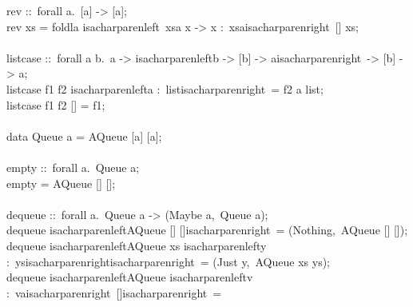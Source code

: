 \begin{isabellebody}
\begin{isamarkuptext}
\hspace*{0pt}rev ::~forall a.~[a] -> [a];\\
\hspace*{0pt}rev xs = foldla {}{}isacharparenleft{}{}~xsa x -> x :~xsa{}{}isacharparenright{}~[] xs;\\
\hspace*{0pt}\\
\hspace*{0pt}list{}case ::~forall a b.~a -> {}{}isacharparenleft{}b -> [b] -> a{}{}isacharparenright{}~-> [b] -> a;\\
\hspace*{0pt}list{}case f1 f2 {}{}isacharparenleft{}a :~list{}{}isacharparenright{}~= f2 a list;\\
\hspace*{0pt}list{}case f1 f2 [] = f1;\\
\hspace*{0pt}\\
\hspace*{0pt}data Queue a = AQueue [a] [a];\\
\hspace*{0pt}\\
\hspace*{0pt}empty ::~forall a.~Queue a;\\
\hspace*{0pt}empty = AQueue [] [];\\
\hspace*{0pt}\\
\hspace*{0pt}dequeue ::~forall a.~Queue a -> (Maybe a,~Queue a);\\
\hspace*{0pt}dequeue {}{}isacharparenleft{}AQueue [] []{}{}isacharparenright{}~= (Nothing,~AQueue [] []);\\
\hspace*{0pt}dequeue {}{}isacharparenleft{}AQueue xs {}{}isacharparenleft{}y :~ys{}{}isacharparenright{}{}{}isacharparenright{}~= (Just y,~AQueue xs ys);\\
\hspace*{0pt}dequeue {}{}isacharparenleft{}AQueue {}{}isacharparenleft{}v :~va{}{}isacharparenright{}~[]{}{}isacharparenright{}~=\\

\end{isamarkuptext}
\end{isabellebody}

